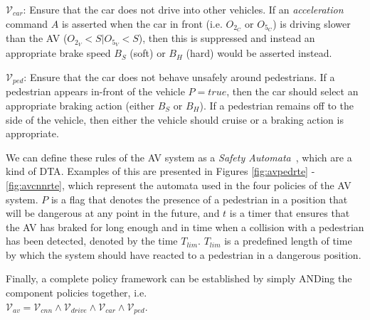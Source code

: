 $\mathcal{V}_{car}$: Ensure that the car does not drive into other vehicles. If an \textit{acceleration} command $A$ is asserted when the car in front (i.e. $O_{2_C}$ or $O_{5_C}$) is driving slower than the \ac{AV} ($O_{2_V}<S|O_{5_V}<S$), then this is suppressed and instead an appropriate brake speed $B_S$ (soft) or $B_H$ (hard) would be asserted instead.

$\mathcal{V}_{ped}$: Ensure that the car does not behave unsafely around pedestrians. If a pedestrian appears in-front of the vehicle $P=true$, then the car should select an appropriate braking action (either $B_S$ or $B_H$). If a pedestrian remains off to the side of the vehicle, then either the vehicle should cruise or a braking action is appropriate.

We can define these rules of the \ac{AV} system as a \textit{Safety Automata}~\cite{recps}, which are a kind of \acf{DTA}. 
Examples of this are presented in Figures \ref{fig:avpedrte} - \ref{fig:avcnnrte}, which represent the automata used in the four policies of the \ac{AV} system.
$P$ is a flag that denotes the presence of a pedestrian in a position that will be dangerous at any point in the future, and $t$ is a timer that ensures that the \ac{AV} has braked for long enough and in time when a collision with a pedestrian has been detected, denoted by the time $T_{lim}$. 
$T_{lim}$ is a predefined length of time by which the system should have reacted to a pedestrian in a dangerous position.

Finally, a complete policy framework can be established by simply ANDing the component policies together, i.e. \\ $\mathcal{V}_{av} = \mathcal{V}_{cnn} \wedge \mathcal{V}_{drive} \wedge \mathcal{V}_{car} \wedge \mathcal{V}_{ped}$.

